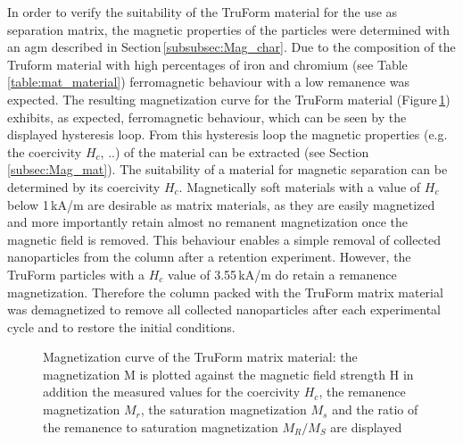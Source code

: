 In order to verify the suitability of the TruForm material for the use as separation matrix, the magnetic properties of the particles were determined with an \gls{agm} described in Section\,\ref{subsubsec:Mag_char}. Due to the composition of the Truform material with high percentages of iron and chromium (see Table\,\ref{table:mat_material}) ferromagnetic behaviour with a low remanence was expected. The resulting magnetization curve for the TruForm material (Figure\,\ref{fig:Prax_hyst}) exhibits, as expected, ferromagnetic behaviour, which can be seen by the displayed hysteresis loop. From this hysteresis loop the magnetic properties (e.g. the coercivity $H_{c}$, ..) of the material can be extracted (see Section \ref{subsec:Mag_mat}). The suitability of a material for magnetic separation can be determined by its coercivity $H_{c}$. Magnetically soft materials with a value of $H_{c}$ below 1\,kA/m are desirable as matrix materials, as they are easily magnetized and more importantly retain almost no remanent magnetization once the magnetic field is removed. This behaviour enables a simple removal of collected nanoparticles from the column after a retention experiment. However, the TruForm particles with a $H_{c}$ value of 3.55\,kA/m do retain a remanence magnetization. Therefore the column packed with the TruForm matrix material was demagnetized to remove all collected nanoparticles after each experimental cycle and to restore the initial conditions. \FloatBarrier

\begin{figure}[h]
\centering

\caption[Magnetization curve of the TruForm matrix material]{Magnetization curve of the TruForm matrix material: the magnetization M is plotted against the magnetic field strength H in addition the measured values for the coercivity $H_{c}$, the remanence magnetization $M_{r}$, the saturation magnetization $M_{s}$ and the ratio of the remanence to saturation magnetization $M_{R}/M_{S}$ are displayed
\label{fig:Prax_hyst}
}
\end{figure}

